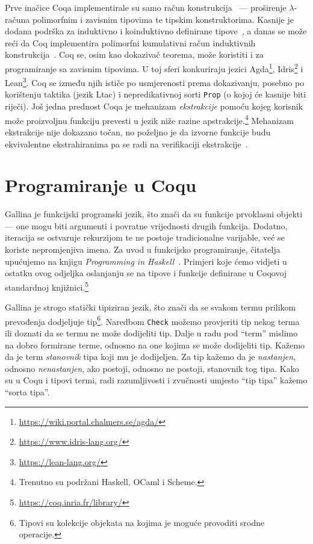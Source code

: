 Prve inačice Coqa implementirale su samo račun konstrukcija~\cite{coc} ---
proširenje \(\lambda\)-računa polimorfnim i zavisnim tipovima te tipskim konstruktorima.
Kasnije je dodana podrška za induktivno i koinduktivno definirane tipove~\cite{cic, coinductive},
a danas se može reći da Coq implementira polimorfni kumulativni račun induktivnih konstrukcija~\cite{coqcoqcorrect}.
Coq se, osim kao dokazivač teorema, može koristiti i za programiranje sa zavisnim tipovima.
U toj sferi konkuriraju jezici Agda\footnote{\url{https://wiki.portal.chalmers.se/agda/}}, Idris\footnote{\url{https://www.idris-lang.org/}} i Lean\footnote{\url{https://lean-lang.org/}}. Coq se između njih ističe po usmjerenosti prema dokazivanju, posebno po korištenju taktika (jezik Ltac) i nepredikativnoj sorti \texttt{Prop} (o kojoj će kasnije biti riječi).
Još jedna prednost Coqa je mehanizam \textit{ekstrakcije} pomoću kojeg korisnik može proizvoljnu funkciju prevesti u jezik niže razine apstrakcije.\footnote{Trenutno su podržani Haskell, OCaml i Scheme.}
Mehanizam ekstrakcije nije dokazano točan, no poželjno je da izvorne funkcije budu ekvivalentne ekstrahiranima pa se radi na verifikaciji ekstrakcije~\cite{coqcoqcorrect}.

\section{Programiranje u Coqu}\label{sec:programiranje-u-gallini}
Gallina je funkcijski programski jezik, što znači da su funkcije prvoklasni objekti ---
one mogu biti argumenti i povratne vrijednosti drugih funkcija.
Dodatno, iteracija se ostvaruje rekurzijom te ne postoje tradicionalne varijable, već se koriste nepromjenjiva  imena.
Za uvod u funkcijsko programiranje, čitatelja upućujemo na knjigu \textit{Programming in Haskell}~\cite{Hutton_2016}.
Primjeri koje ćemo vidjeti u ostatku ovog odjeljka oslanjanju se na tipove i funkcije definirane u Coqovoj standardnoj knjižnici.\footnote{\url{https://coq.inria.fr/library/}}

Gallina je strogo statički tipiziran jezik, što znači da se svakom termu prilikom prevođenja dodjeljuje tip\footnote{Tipovi su kolekcije objekata na kojima je moguće provoditi srodne operacije.}.
Naredbom \texttt{Check} možemo provjeriti tip nekog terma ili doznati da se termu ne može dodijeliti tip.
Dalje u radu pod \enquote{term} mislimo na dobro formirane terme, odnosno na one kojima se može dodijeliti tip.
Kažemo da je term \textit{stanovnik} tipa koji mu je dodijeljen.
Za tip kažemo da je \textit{nastanjen}, odnosno \textit{nenastanjen}, ako postoji, odnosno ne postoji, stanovnik tog tipa.
Kako su u Coqu i tipovi termi, radi razumljivosti i zvučnosti umjesto \enquote{tip tipa} kažemo \enquote{sorta tipa}.

